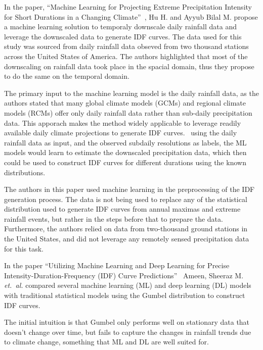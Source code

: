 In the paper, ``Machine Learning for Projecting Extreme Precipitation Intensity for Short Durations in a Changing Climate''~\cite{geosciences9050209}, Hu H. and Ayyub Bilal M. propose a machine learning solution to temporaly downscale daily rainfall data and leverage the downscaled data to generate IDF curves. The data used for this study was sourced from daily rainfall data obseved from two thousand stations across the United States of America. The authors highlighted that most of the downscaling on rainfall data took place in the spacial domain, thus they propose to do the same on the temporal domain.~\cite{geosciences9050209}

The primary input to the machine learning model is the daily rainfall data, as the authors stated that many global climate models (GCMs) and regional climate models (RCMs) offer only daily rainfall data rather than sub-daily precipitation data. This apporach makes the method widely applicable to leverage readily available daily climate projections to generate IDF curves.~\cite{geosciences9050209} using the daily rainfall data as input, and the observed subdaily resolutions as labels, the ML models would learn to estimate the downscaled precipitation data, which then could be used to construct IDF curves for different durations using the known distributions.

The authors in this paper used machine learning in the preprocessing of the IDF generation process. The data is not being used to replace any of the statistical distribution used to generate IDF curves from  annual maximas and extreme rainfall events, but rather in the steps before that to prepare the data. Furthermore, the authors relied on data from two-thousand ground stations in the United States, and did not leverage any remotely sensed precipitation data for this task.

\vspace{1em}

In the paper ``Utilizing Machine Learning and Deep Learning for Precise Intensity-Duration-Frequency (IDF) Curve Predictions''~\cite{idfkoya} Ameen, Sheeraz M. \emph{et.~al.} compared several machine learning (ML) and deep learning (DL) models with traditional statistical models using the Gumbel distribution to construct IDF curves.

The initial intuition is that Gumbel only performs well on stationary data that doesn't change over time, but fails to capture the changes in rainfall trends due to climate change, something that ML and DL are well suited for.~\cite{idfkoya}

